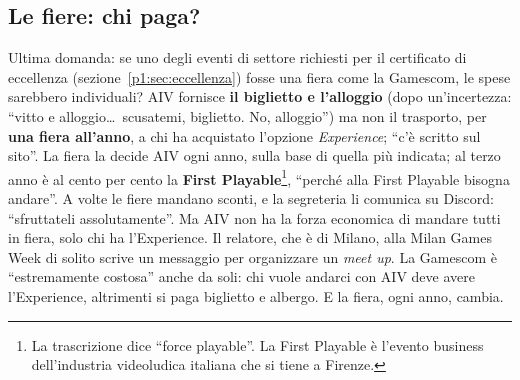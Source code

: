 \subsection{Le fiere: chi paga?}

Ultima domanda: se uno degli eventi di settore richiesti per il certificato
di eccellenza (sezione~\ref{p1:sec:eccellenza}) fosse una fiera come la
Gamescom, le spese sarebbero individuali? AIV fornisce \textbf{il biglietto
e l'alloggio} (dopo un'incertezza: ``vitto e alloggio\ldots\ scusatemi,
biglietto. No, alloggio'') ma non il trasporto, per \textbf{una fiera
all'anno}, a chi ha acquistato l'opzione \emph{Experience}; ``c'è scritto
sul sito''. La fiera la decide AIV ogni anno, sulla base di quella più
indicata; al terzo anno è al cento per cento la \textbf{First
Playable}\footnote{La trascrizione dice ``force playable''. La First
Playable è l'evento business dell'industria videoludica italiana che si
tiene a Firenze.}, ``perché alla First Playable bisogna andare''. A volte
le fiere mandano sconti, e la segreteria li comunica su Discord:
``sfruttateli assolutamente''. Ma AIV non ha la forza economica di mandare
tutti in fiera, solo chi ha l'Experience. Il relatore, che è di Milano, alla
Milan Games Week di solito scrive un messaggio per organizzare un
\emph{meet up}. La Gamescom è ``estremamente costosa'' anche da soli: chi
vuole andarci con AIV deve avere l'Experience, altrimenti si paga biglietto
e albergo. E la fiera, ogni anno, cambia.
